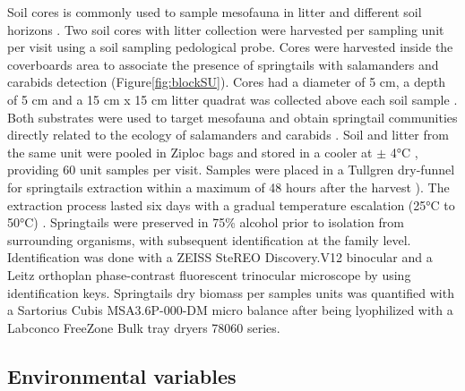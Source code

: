 Soil cores is commonly used to sample mesofauna in litter and different soil horizons \citep{chauvatChangesSoilFaunal2011a,farskaManagementIntensityAffects2014,pongeVerticalDistributionCollembola2000,salamonEffectsPlantDiversity2004,wuCompositionSpatiotemporalVariation2014}. 
Two soil cores with litter collection were harvested per sampling unit per visit using a soil sampling pedological probe. 
Cores were harvested inside the coverboards area to associate the presence of springtails with salamanders and carabids detection (Figure\ref{fig:blockSU}). 
Cores had a diameter of 5 cm, a depth of 5 cm and a 15 cm x 15 cm litter quadrat was collected above each soil sample \citep{rousseauForestFloorMesofauna2018}.
Both substrates were used to target mesofauna and obtain springtail communities directly related to the ecology of salamanders and carabids \citep{chauvatChangesSoilFaunal2011a,edwardsAssessmentPopulationsSoilinhabiting1991,raymond-leonardSpringtailCommunityStructure2018a,rousseauForestFloorMesofauna2018}.
Soil and litter from the same unit were pooled in Ziploc\up{\texttrademark{}} bags and stored in a cooler at $\pm$ 4°C \citep{chauvatChangesSoilFaunal2011a,rousseauForestFloorMesofauna2018}, providing 60 unit samples per visit.
Samples were placed in a Tullgren dry-funnel for springtails extraction within a maximum of 48 hours after the harvest \citealp{rousseauForestFloorMesofauna2018,rusekBiodiversityCollembolaTheir1998,wuCompositionSpatiotemporalVariation2014}). 
The extraction process lasted six days with a gradual temperature escalation (25°C to 50°C) \citep{raymond-leonardSpringtailCommunityStructure2018a}.
Springtails were preserved in 75\% alcohol \citep{wuCompositionSpatiotemporalVariation2014} prior to isolation from surrounding organisms, with subsequent identification at the family level.
Identification was done with a ZEISS SteREO Discovery.V12 binocular and a Leitz orthoplan phase-contrast fluorescent trinocular microscope by using \cite{bellingerChecklistCollembolaWorld1996} identification keys.
Springtails dry biomass per samples units was quantified with a Sartorius Cubis\up{\texttrademark{}} MSA3.6P-000-DM micro balance after being lyophilized with a Labconco FreeZone Bulk tray dryers 78060 series.




\subsection*{Environmental variables}
\label{subsec:EnvVar}

